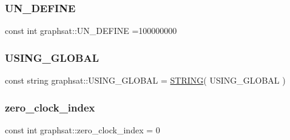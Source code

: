 \subsubsection{\texorpdfstring{UN\_DEFINE}{UN\_DEFINE}}
{\footnotesize\ttfamily const int graphsat\+::\+U\+N\+\_\+\+D\+E\+F\+I\+NE =100000000\hspace{0.3cm}{\ttfamily [static]}}

\mbox{\label{namespacegraphsat_a483442a80bab39b2da13ccdd04e4cf3d}} 
\subsubsection{\texorpdfstring{USING\_GLOBAL}{USING\_GLOBAL}}
{\footnotesize\ttfamily const string graphsat\+::\+U\+S\+I\+N\+G\+\_\+\+G\+L\+O\+B\+AL = \mbox{\hyperlink{data_8hpp_a8f7bd5242b15da973671df869db5fe85}{S\+T\+R\+I\+NG}}( U\+S\+I\+N\+G\+\_\+\+G\+L\+O\+B\+AL )\hspace{0.3cm}{\ttfamily [static]}}

\mbox{\label{namespacegraphsat_a3a7778675bb2df267cba6672151335e7}} 
\subsubsection{\texorpdfstring{zero\_clock\_index}{zero\_clock\_index}}
{\footnotesize\ttfamily const int graphsat\+::zero\+\_\+clock\+\_\+index = 0\hspace{0.3cm}{\ttfamily [static]}}

